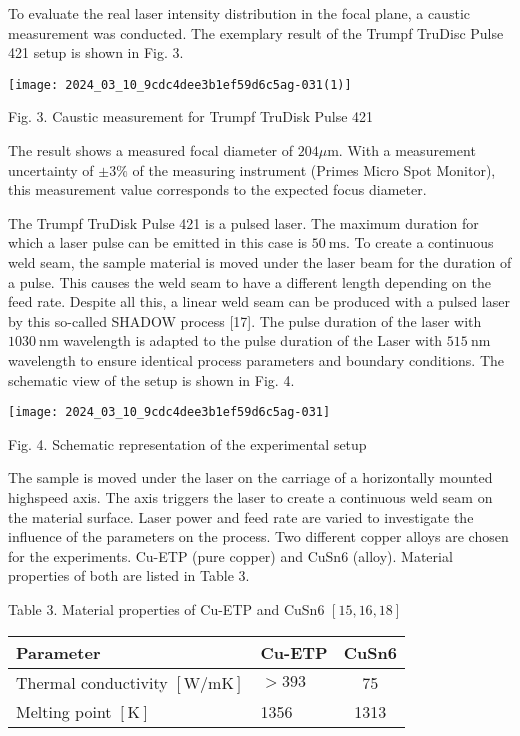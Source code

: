 \documentclass[10pt]{article}
\begin{document}
To evaluate the real laser intensity distribution in the focal plane, a caustic measurement was conducted. The exemplary result of the Trumpf TruDisc Pulse 421 setup is shown in Fig. 3.

\begin{center}
\texttt{[image: 2024\_03\_10\_9cdc4dee3b1ef59d6c5ag-031(1)]}
\end{center}

Fig. 3. Caustic measurement for Trumpf TruDisk Pulse 421

The result shows a measured focal diameter of $204 \mu \mathrm{m}$. With a measurement uncertainty of $\pm 3 \%$ of the measuring instrument (Primes Micro Spot Monitor), this measurement value corresponds to the expected focus diameter.

The Trumpf TruDisk Pulse 421 is a pulsed laser. The maximum duration for which a laser pulse can be emitted in this case is $50 \mathrm{~ms}$. To create a continuous weld seam, the sample material is moved under the laser beam for the duration of a pulse. This causes the weld seam to have a different length depending on the feed rate. Despite all this, a linear weld seam can be produced with a pulsed laser by this so-called SHADOW process [17]. The pulse duration of the laser with $1030 \mathrm{~nm}$ wavelength is adapted to the pulse duration of the Laser with $515 \mathrm{~nm}$ wavelength to ensure identical process parameters and boundary conditions. The schematic view of the setup is shown in Fig. 4.

\begin{center}
\texttt{[image: 2024\_03\_10\_9cdc4dee3b1ef59d6c5ag-031]}
\end{center}

Fig. 4. Schematic representation of the experimental setup

The sample is moved under the laser on the carriage of a horizontally mounted highspeed axis. The axis triggers the laser to create a continuous weld seam on the material surface. Laser power and feed rate are varied to investigate the influence of the parameters on the process. Two different copper alloys are chosen for the experiments. Cu-ETP (pure copper) and CuSn6 (alloy). Material properties of both are listed in Table 3.

Table 3. Material properties of Cu-ETP and CuSn6 $[15,16,18]$

\begin{center}
\begin{tabular}{l|l|c}
\hline
Parameter & Cu-ETP & CuSn6 \\
\hline
Thermal conductivity $[\mathrm{W} / \mathrm{mK}]$ & $>393$ & 75 \\
\hline
Melting point $[\mathrm{K}]$ & 1356 & 1313 \\
\hline
\end{tabular}
\end{center}
\end{document}
